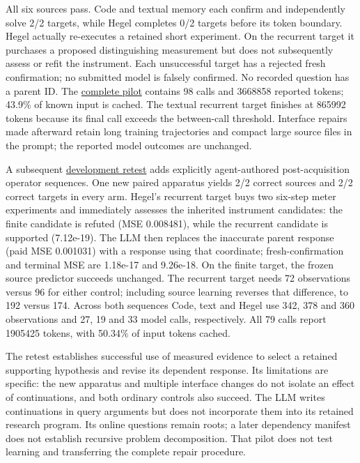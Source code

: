 \documentclass[11pt,a4paper]{article}
\begin{document}
All six sources pass. Code and textual memory each confirm and independently
solve 2/2 targets, while Hegel completes 0/2 targets before its token boundary.
Hegel actually re-executes a retained short experiment. On the recurrent target
it purchases a proposed distinguishing measurement but does not subsequently
assess or refit the instrument. Each unsuccessful target has a rejected fresh
confirmation; no submitted model is falsely confirmed. No recorded question
has a parent ID. The \hyperlink{artifact-56}{complete pilot}
contains 98 calls and 3668858 reported tokens; 43.9\% of known input is cached.
The textual recurrent target finishes at 865992 tokens because its final call
exceeds the between-call threshold. Interface repairs made afterward retain
long training trajectories and compact large source files in the prompt;
the reported model outcomes are unchanged.


A subsequent \hyperlink{artifact-57}{development retest}
adds explicitly agent-authored post-acquisition operator sequences. One new
paired apparatus yields 2/2 correct sources and 2/2 correct targets in every
arm. Hegel's recurrent target buys two six-step meter experiments and immediately
assesses the inherited instrument candidates: the finite candidate is refuted
(MSE 0.008481), while the recurrent candidate is supported (7.12e-19). The LLM
then replaces the inaccurate parent response (paid MSE 0.001031) with a response
using that coordinate; fresh-confirmation and terminal MSE are 1.18e-17 and
9.26e-18. On the finite target, the frozen source predictor succeeds unchanged.
The recurrent target needs 72 observations versus 96 for either control;
including source learning reverses that difference, to 192 versus 174. Across
both sequences Code, text and Hegel use 342, 378 and 360 observations and 27, 19
and 33 model calls, respectively. All 79 calls report 1905425 tokens, with
50.34\% of input tokens cached.


The retest establishes successful use of measured evidence to select a retained
supporting hypothesis and revise its dependent response. Its limitations are
specific: the new apparatus and multiple interface changes do not isolate an
effect of continuations, and both ordinary controls also succeed. The LLM writes
continuations in query arguments but does not incorporate them into its retained
research program. Its online questions remain roots; a later dependency manifest
does not establish recursive problem decomposition. That pilot does not test
learning and transferring the complete repair procedure.
\end{document}
